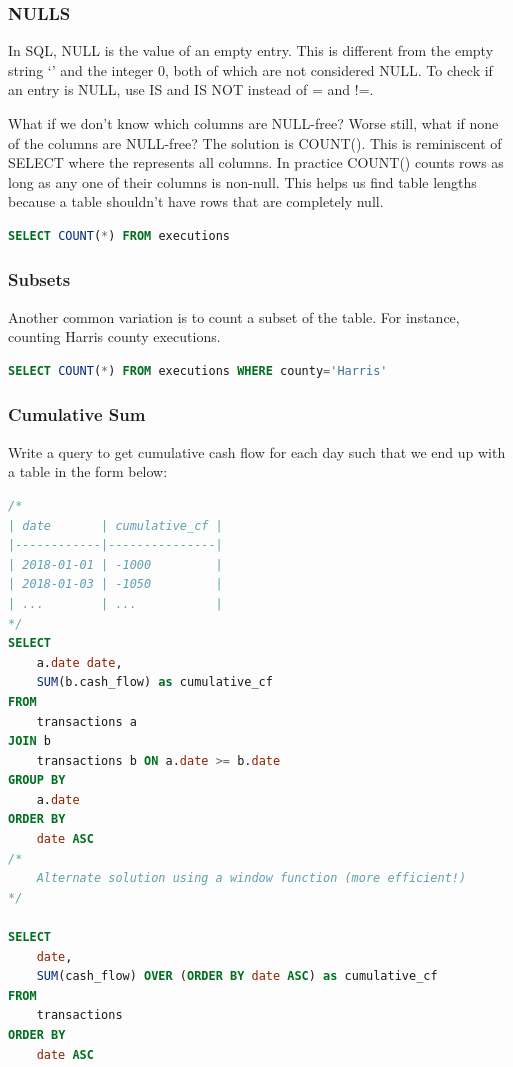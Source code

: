 \documentclass{article}
\begin{document}
\subsubsection{NULLS}

In SQL, NULL is the value of an empty entry. This is different from the empty string `' and the integer 0, both of which are not considered NULL. To check if an entry is NULL, use IS and IS NOT instead of = and !=.

What if we don’t know which columns are NULL-free? Worse still, what if none of the columns are NULL-free?  The solution is COUNT(\*). This is reminiscent of SELECT \* where the \* represents all columns. In practice COUNT(\*) counts rows as long as any one of their columns is non-null. This helps us find table lengths because a table shouldn’t have rows that are completely null.

\vspace{8pt} \begin{lstlisting}[language=SQL]
SELECT COUNT(*) FROM executions
\end{lstlisting} \vspace{8pt}

\subsubsection{Subsets}
Another common variation is to count a subset of the table. For instance, counting Harris county executions.

\vspace{8pt} \begin{lstlisting}[language=SQL]
SELECT COUNT(*) FROM executions WHERE county='Harris'
\end{lstlisting} \vspace{8pt}

\subsubsection{Cumulative Sum}

Write a query to get cumulative cash flow for each day such that we end up with a table in the form below: 

\vspace{8pt} \begin{lstlisting}[language=SQL]
/*
| date       | cumulative_cf |
|------------|---------------|
| 2018-01-01 | -1000         |
| 2018-01-03 | -1050         |
| ...        | ...           |
*/
SELECT 
    a.date date, 
    SUM(b.cash_flow) as cumulative_cf 
FROM
    transactions a
JOIN b 
    transactions b ON a.date >= b.date 
GROUP BY 
    a.date 
ORDER BY 
    date ASC
/* 
    Alternate solution using a window function (more efficient!)
*/

SELECT 
    date, 
    SUM(cash_flow) OVER (ORDER BY date ASC) as cumulative_cf 
FROM
    transactions 
ORDER BY 
    date ASC
\end{lstlisting} \vspace{8pt}
\end{document}
